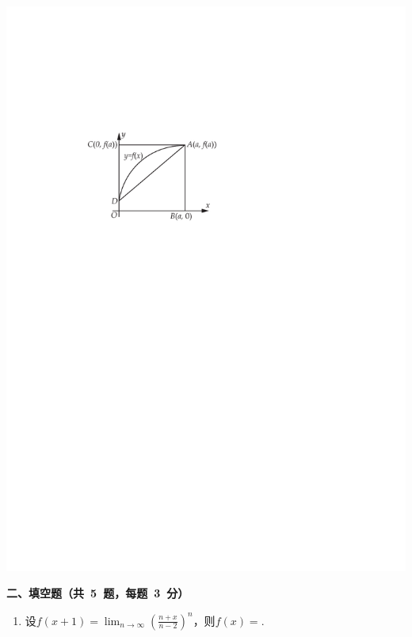 \documentclass[11pt,a4paper]{ctexart}
\begin{document}
\begin{framed}
\begin{enumerate}
		\begin{center}
			\includegraphics[scale = 0.7]{fig/figure1.pdf}
		\end{center}


		
		

		
	\end{enumerate}
	\begin{large}
			\noindent\textbf{二、填空题（共~5~题，每题~3~分）}
	\end{large}        
	\begin{enumerate}

		\item 设\(f(x + 1) = \displaystyle \lim_{n \to \infty} \left(\frac{n + x}{n - 2}\right)^n\)，则\(f(x) = \)\tk{}.


\end{enumerate}
\end{framed}
\end{document}
